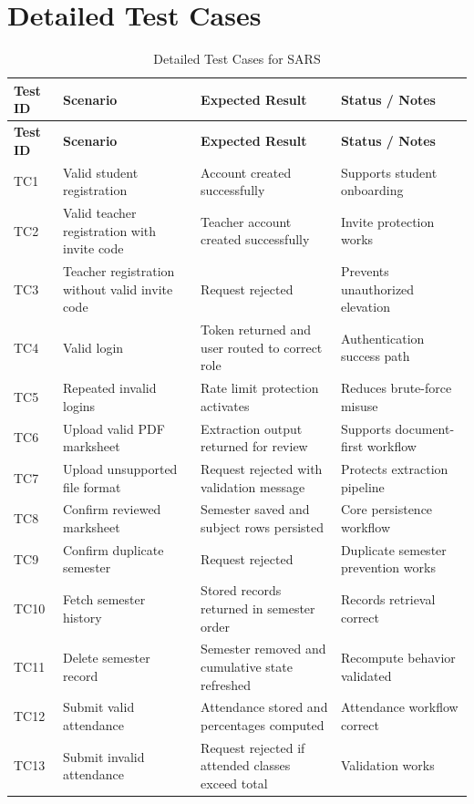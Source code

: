 \section{Detailed Test Cases}
\begin{longtable}{p{}p{}p{}p{}}
\caption{Detailed Test Cases for SARS}\\
\toprule
\textbf{Test ID} & \textbf{Scenario} & \textbf{Expected Result} & \textbf{Status / Notes} \\
\midrule
\endfirsthead
\toprule
\textbf{Test ID} & \textbf{Scenario} & \textbf{Expected Result} & \textbf{Status / Notes} \\
\midrule
\endhead
TC1 & Valid student registration & Account created successfully & Supports student onboarding \\
TC2 & Valid teacher registration with invite code & Teacher account created successfully & Invite protection works \\
TC3 & Teacher registration without valid invite code & Request rejected & Prevents unauthorized elevation \\
TC4 & Valid login & Token returned and user routed to correct role & Authentication success path \\
TC5 & Repeated invalid logins & Rate limit protection activates & Reduces brute-force misuse \\
TC6 & Upload valid PDF marksheet & Extraction output returned for review & Supports document-first workflow \\
TC7 & Upload unsupported file format & Request rejected with validation message & Protects extraction pipeline \\
TC8 & Confirm reviewed marksheet & Semester saved and subject rows persisted & Core persistence workflow \\
TC9 & Confirm duplicate semester & Request rejected & Duplicate semester prevention works \\
TC10 & Fetch semester history & Stored records returned in semester order & Records retrieval correct \\
TC11 & Delete semester record & Semester removed and cumulative state refreshed & Recompute behavior validated \\
TC12 & Submit valid attendance & Attendance stored and percentages computed & Attendance workflow correct \\
TC13 & Submit invalid attendance & Request rejected if attended classes exceed total & Validation works \\

\end{longtable}
